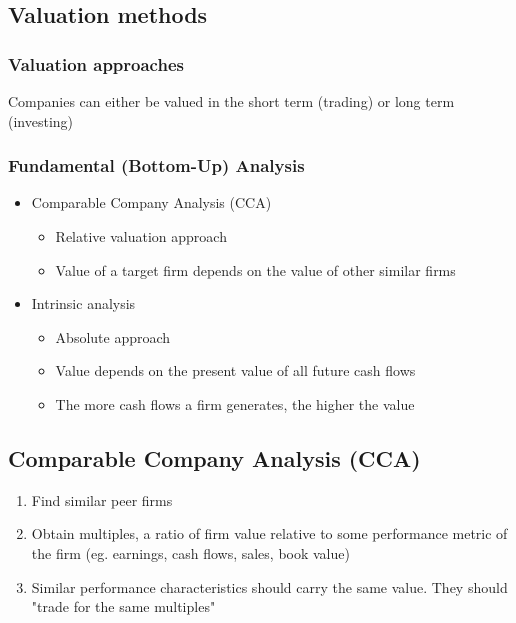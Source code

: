 \documentclass{article}
\begin{document}
	\subsection{Valuation methods}

		\subsubsection{Valuation approaches}

			Companies can either be valued in the short term (trading) or long term (investing)

		\subsubsection{Fundamental (Bottom-Up) Analysis}

			\begin{itemize}
				\item Comparable Company Analysis (CCA)
					\begin{itemize}
						\item Relative valuation approach
						\item Value of a target firm depends on the value of other similar firms
					\end{itemize}
				\item Intrinsic analysis
					\begin{itemize}
						\item Absolute approach
						\item Value depends on the present value of all future cash flows
						\item The more cash flows a firm generates, the higher the value
					\end{itemize}
			\end{itemize}

	\subsection{Comparable Company Analysis (CCA)}

		\begin{enumerate}
			\item Find similar peer firms
			\item Obtain multiples, a ratio of firm value relative to some performance metric of the firm (eg. earnings, cash flows, sales, book value)
			\item Similar performance characteristics should carry the same value. They should "trade for the same multiples"
		\end{enumerate}
\end{document}
